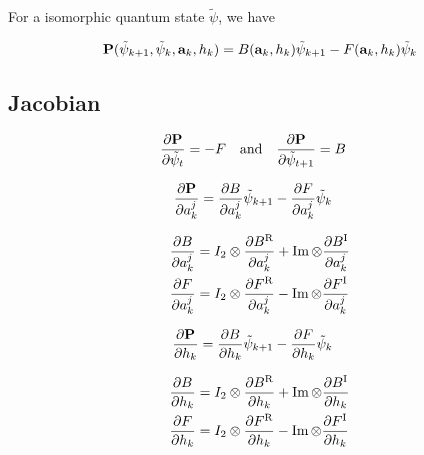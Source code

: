 \documentclass{article}
\newcommand{\isopsi}{\tilde \psi}
\newcommand{\BR}{B^{\text{R}}}
\newcommand{\BI}{B^{\text{I}}}
\newcommand{\FR}{F^{\text{R}}}
\newcommand{\FI}{F^{\text{I}}}
\begin{document}
For a isomorphic quantum state $\isopsi$, we have

\begin{equation*}
  \vb{P}(\isopsi_{k+1}, \isopsi_k, \vb{a}_k, h_k) = B(\vb{a}_k, h_k) \isopsi_{k+1} - F(\vb{a}_k, h_k) \isopsi_k
\end{equation*}

\subsection{Jacobian}
\begin{align*}
  \pdv{\vb{P}}{\isopsi_t} &= - F \quad \text{and} \quad
  \pdv{\vb{P}}{\isopsi_{t+1}} = B
\end{align*}

\begin{align*}
  \pdv{\vb{P}}{a^j_k} &= \pdv{B}{a^j_k} \isopsi_{k+1} - \pdv{F}{a^j_k} \isopsi_k 
\end{align*}

\begin{align*}
  \pdv{B}{a^j_k} &= I_2 \otimes \pdv{\BR}{a^j_k} + \Im \otimes \pdv{\BI}{a^j_k} \\
  \pdv{F}{a^j_k} &= I_2 \otimes \pdv{\FR}{a^j_k} - \Im \otimes \pdv{\FI}{a^j_k} 
\end{align*}

\begin{align*}
  \pdv{\vb{P}}{h_k} &= \pdv{B}{h_k} \isopsi_{k+1} - \pdv{F}{h_k} \isopsi_k
\end{align*}

\begin{align*}
  \pdv{B}{h_k} &= I_2 \otimes \pdv{\BR}{h_k} + \Im \otimes \pdv{\BI}{h_k} \\
  \pdv{F}{h_k} &= I_2 \otimes \pdv{\FR}{h_k} - \Im \otimes \pdv{\FI}{h_k}
\end{align*} 
\end{document}
